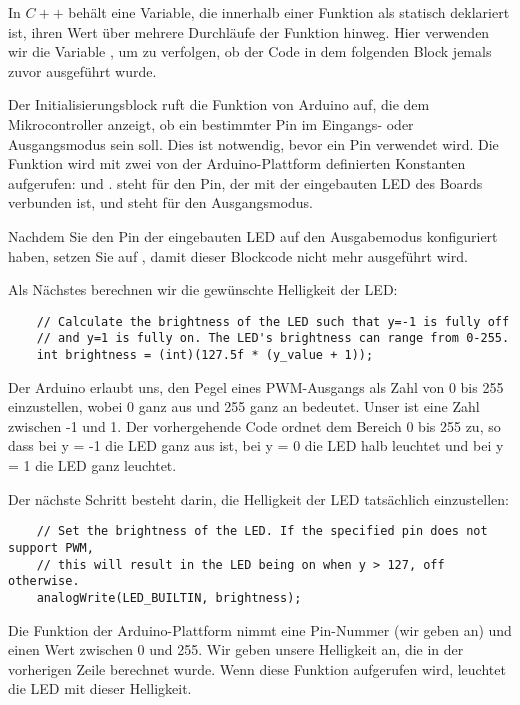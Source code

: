  
In $C++$ behält eine Variable, die innerhalb einer Funktion als statisch deklariert ist, ihren Wert über mehrere Durchläufe der Funktion hinweg. Hier verwenden wir die Variable , um zu verfolgen, ob der Code in dem  folgenden Block  jemals zuvor ausgeführt wurde.
     
Der Initialisierungsblock ruft die Funktion  von Arduino auf, die dem Mikrocontroller anzeigt, ob ein bestimmter Pin im Eingangs- oder Ausgangsmodus sein soll. Dies ist notwendig, bevor ein Pin verwendet wird. Die Funktion wird mit zwei von der Arduino-Plattform definierten Konstanten aufgerufen:   und .   steht für den Pin, der mit der eingebauten LED des Boards verbunden ist, und  steht für den Ausgangsmodus.
     
Nachdem Sie den Pin der eingebauten LED auf den Ausgabemodus konfiguriert haben, setzen Sie  auf , damit dieser Blockcode nicht mehr ausgeführt wird.

Als Nächstes berechnen wir die gewünschte Helligkeit der LED:
     
     
\begin{lstlisting}
    // Calculate the brightness of the LED such that y=-1 is fully off
 	// and y=1 is fully on. The LED's brightness can range from 0-255.
 	int brightness = (int)(127.5f * (y_value + 1));
\end{lstlisting} 

Der Arduino erlaubt uns, den Pegel eines PWM-Ausgangs als Zahl von 0 bis 255 einzustellen, wobei 0 ganz aus und 255 ganz an bedeutet. Unser  ist eine Zahl zwischen -1 und 1. Der vorhergehende Code ordnet  dem Bereich 0 bis 255 zu, so dass bei y = -1 die LED ganz aus ist, bei y = 0 die LED halb leuchtet und bei y = 1 die LED ganz leuchtet.

Der nächste Schritt besteht darin, die Helligkeit der LED tatsächlich einzustellen:

\begin{lstlisting}
    // Set the brightness of the LED. If the specified pin does not support PWM,
 	// this will result in the LED being on when y > 127, off otherwise.
 	analogWrite(LED_BUILTIN, brightness);
\end{lstlisting} 

Die Funktion  der Arduino-Plattform nimmt eine Pin-Nummer (wir geben  an) und einen Wert zwischen 0 und 255. Wir geben unsere Helligkeit an, die in der vorherigen Zeile berechnet wurde. Wenn diese Funktion aufgerufen wird, leuchtet die LED mit dieser Helligkeit.


